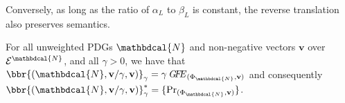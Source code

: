\documentclass[letterpaper]{article} %
\theoremstyle{plain}
\newtheorem{coro}{Corollary}[theorem]
\theoremstyle{definition}
\theoremstyle{remark}
\newcommand{\begthm}[3][]{\begin{#2}[{name=#1},restate=#3,label=#3]}
\newcommand{\commentout}[1]{\ignorespaces}
\newcommand\mat[1]{\mathbf{#1}}
\newcommand{\bp}[1][L]{\mat{p}_{\!_{#1}\!}}
\newcommand{\Ed}{\mathcal E}
\newcommand{\dg}[1]{\mathbdcal{#1}}
\newcommand{\Gr}{\mathcal G}
\newcommand\GFE{\mathit{G\mkern-4mu F\mkern-4.5mu E}}
\newcommand{\ed}[3]{#2\!%
  \overset{\smash{\mskip-5mu\raisebox{-1pt}{$\scriptscriptstyle
        #1$}}}{\rightarrow}\! #3}
\begin{document}
Conversely, as long as the ratio of $\alpha_L$ to $\beta_L$ is constant, the
reverse translation also preserves semantics.
\begthm{theorem}{thm:pdg-is-wfg}
For all unweighted PDGs $\dg{N}$ and non-negative vectors $\mat v$
over $\Ed^{\dg N}$, and all $\gamma > 0$, we have that 
$\bbr{(\dg N, \mat v/\gamma, \mat v)}_{\gamma} 
		= \gamma\,\GFE_{(\Phi_{\dg N}, \mat v)} $ and consequently
$\bbr{(\dg N, \mat v/\gamma, \mat v)}_{\gamma}^*
		= \{\Pr_{(\Phi_{\dg N}, \mat v)} \}$. 
\end{theorem}



\commentout{
We have seen that only a subset of PDGs can be faithfully 
represented as WFGs; we now show the other side of the correspondence: any
factor graph be captured by more than one PDG (though again, only for a fixed $\gamma$).
}
\end{document}
